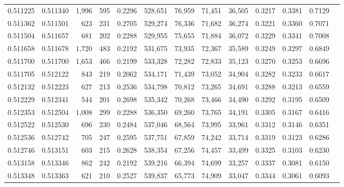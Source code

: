 \begin{tabular}{rrrrrrrrrrrrr}
0.511225 & 0.511340 & 1,996 &   595 &                                     0.2296 & 528,651 &  76,959 &  71,451 &  36,505 & 0.3217 & 0.3381 & 0.7129 \\
0.511362 & 0.511501 &   623 &   231 &                                     0.2705 & 529,274 &  76,336 &  71,682 &  36,274 & 0.3221 & 0.3360 & 0.7071 \\
0.511504 & 0.511657 &   681 &   202 &                                     0.2288 & 529,955 &  75,655 &  71,884 &  36,072 & 0.3229 & 0.3341 & 0.7008 \\
0.511658 & 0.511678 & 1,720 &   483 &                                     0.2192 & 531,675 &  73,935 &  72,367 &  35,589 & 0.3249 & 0.3297 & 0.6849 \\
0.511700 & 0.511700 & 1,653 &   466 &                                     0.2199 & 533,328 &  72,282 &  72,833 &  35,123 & 0.3270 & 0.3253 & 0.6696 \\
0.511705 & 0.512122 &   843 &   219 &                                     0.2062 & 534,171 &  71,439 &  73,052 &  34,904 & 0.3282 & 0.3233 & 0.6617 \\
0.512132 & 0.512223 &   627 &   213 &                                     0.2536 & 534,798 &  70,812 &  73,265 &  34,691 & 0.3288 & 0.3213 & 0.6559 \\
0.512229 & 0.512341 &   544 &   201 &                                     0.2698 & 535,342 &  70,268 &  73,466 &  34,490 & 0.3292 & 0.3195 & 0.6509 \\
0.512353 & 0.512504 & 1,008 &   299 &                                     0.2288 & 536,350 &  69,260 &  73,765 &  34,191 & 0.3305 & 0.3167 & 0.6416 \\
0.512522 & 0.512530 &   696 &   230 &                                     0.2484 & 537,046 &  68,564 &  73,995 &  33,961 & 0.3312 & 0.3146 & 0.6351 \\
0.512536 & 0.512742 &   705 &   247 &                                     0.2595 & 537,751 &  67,859 &  74,242 &  33,714 & 0.3319 & 0.3123 & 0.6286 \\
0.512746 & 0.513151 &   603 &   215 &                                     0.2628 & 538,354 &  67,256 &  74,457 &  33,499 & 0.3325 & 0.3103 & 0.6230 \\
0.513158 & 0.513346 &   862 &   242 &                                     0.2192 & 539,216 &  66,394 &  74,699 &  33,257 & 0.3337 & 0.3081 & 0.6150 \\
0.513348 & 0.513363 &   621 &   210 &                                     0.2527 & 539,837 &  65,773 &  74,909 &  33,047 & 0.3344 & 0.3061 & 0.6093 \\

\end{tabular}
